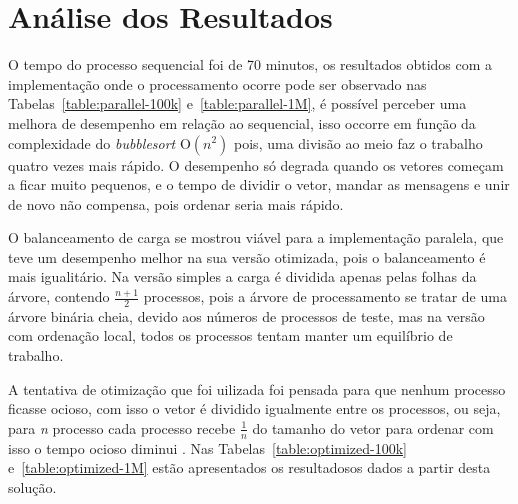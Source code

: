 \section{Análise dos Resultados}

O tempo do processo sequencial foi de 70 minutos, os resultados obtidos com a implementação onde o
processamento ocorre pode ser observado nas Tabelas~\ref{table:parallel-100k}
e~\ref{table:parallel-1M}, é possível perceber uma melhora de desempenho em relação ao sequencial, 
isso occorre em função da complexidade do \emph{bubblesort} O$(n^2)$ pois, uma divisão ao meio 
faz o trabalho quatro vezes mais rápido. O desempenho só degrada quando os vetores começam a ficar
muito pequenos, e o tempo de dividir o vetor, mandar as mensagens e unir de novo não compensa, pois
ordenar seria mais rápido.






O balanceamento de carga se mostrou viável para a implementação paralela, que teve um desempenho
melhor na sua versão otimizada, pois o balanceamento é mais igualitário. Na versão simples a 
carga é dividida apenas pelas folhas da árvore, contendo $\frac{n+1}{2}$ processos, pois a árvore de
processamento se tratar de uma árvore binária cheia, devido aos números de processos de teste, mas
na versão com ordenação local, todos os processos tentam manter um equilíbrio de trabalho.

A tentativa de otimização que foi uilizada foi pensada para que nenhum processo ficasse ocioso, com
isso o vetor é dividido igualmente entre os processos, ou seja, para \emph{n} processo cada processo
recebe $\frac{1}{n}$ do tamanho do vetor para ordenar com isso o tempo ocioso diminui . Nas
Tabelas~\ref{table:optimized-100k} e~\ref{table:optimized-1M} estão apresentados os resultadosos
dados a partir desta solução. 

